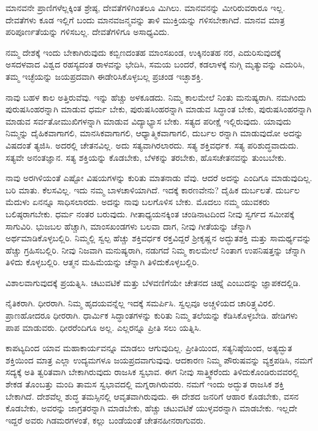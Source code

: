 ಮಾನವನೇ ಪ್ರಾಣಿಗಳೆಲ್ಲಕ್ಕಿಂತ ಶ್ರೇಷ್ಠ, ದೇವತೆಗಳಿಗಿಂತಲೂ ಮಿಗಿಲು. ಮಾನವನನ್ನು ಮೀರಿರುವರಾರೂ ಇಲ್ಲ. ದೇವತೆಗಳು ಕೂಡ ಇಲ್ಲಿಗೆ ಬಂದು ಮಾನವಜನ್ಮವನ್ನು ತಾಳಿ ಮುಕ್ತಿಯನ್ನು ಗಳಿಸಬೇಕಾಗಿದೆ. ಮಾನವ ಮಾತ್ರ ಪರಿಪೂರ್ಣತೆಯನ್ನು ಗಳಿಸಬಲ್ಲ. ದೇವತೆಗಳಿಗೂ ಅಸಾಧ್ಯವಿದು.

ನಮ್ಮ ದೇಶಕ್ಕೆ ಇಂದು ಬೇಕಾಗಿರುವುದು ಕಬ್ಬಿಣದಂತಹ ಮಾಂಸಖಂಡ, ಉಕ್ಕಿನಂತಹ ನರ, ಎದುರಿಸುವುದಕ್ಕೆ ಅಸದಳವಾದ ವಿಶ್ವದ ರಹಸ್ಯದಂತ ರಾಳವನ್ನು ಭೇದಿಸಿ, ಸಮಯ ಬಂದರೆ, ಕಡಲಾಳಕ್ಕೆ ನುಗ್ಗಿ ಮೃತ್ಯುವನ್ನು ಎದುರಿಸಿ, ತಮ್ಮ ಇಚ್ಛೆಯನ್ನು ಜಯಪ್ರದವಾಗಿ ಈಡೇರಿಸಿಕೊಳ್ಳಬಲ್ಲ ಪ್ರಚಂಡ ಇಚ್ಛಾಶಕ್ತಿ.

ನಾವು ಬಹಳ ಕಾಲ ಅತ್ತಿರುವೆವು. ಇನ್ನು ಹೆಚ್ಚು ಅಳಕೂಡದು. ನಿಮ್ಮ ಕಾಲಮೇಲೆ ನಿಂತು ಮನುಷ್ಯರಾಗಿ. ನಮಗಿಂದು ಪುರುಷಸಿಂಹರನ್ನಾಗಿ ಮಾಡುವ ಧರ್ಮ ಬೇಕು, ಪುರುಷಸಿಂಹರನ್ನಾಗಿ ಮಾಡುವ ಸಿದ್ಧಾಂತ ಬೇಕು, ಪುರುಷಸಿಂಹರನ್ನಾಗಿ ಮಾಡುವ ಸರ್ವತೋಮುಖಿಗಳನ್ನಾಗಿ ಮಾಡುವ ವಿದ್ಯಾಭ್ಯಾಸ ಬೇಕು. ಸತ್ಯದ ಪರೀಕ್ಷೆ ಇಲ್ಲಿರುವುದು. ಯಾವುದು ನಿಮ್ಮನ್ನು ದೈಹಿಕವಾಗಾಗಲಿ, ಮಾನಸಿಕವಾಗಾಗಲಿ, ಆಧ್ಯಾತ್ಮಿಕವಾಗಾಗಲಿ, ದುರ್ಬಲ ರನ್ನಾಗಿ ಮಾಡುವುದೋ ಅದನ್ನು ವಿಷದಂತೆ ತ್ಯಜಿಸಿ. ಅದರಲ್ಲಿ ಚೇತನವಿಲ್ಲ. ಅದು ಸತ್ಯವಾಗಿರಲಾರದು. ಸತ್ಯ ಶಕ್ತಿವರ್ಧಕ. ಸತ್ಯ ಪರಿಶುದ್ಧವಾದುದು. ಸತ್ಯವೇ ಅನಂತಜ್ಞಾನ. ಸತ್ಯ ಶಕ್ತಿಯನ್ನು ಕೊಡಬೇಕು, ಬೆಳಕನ್ನು ತರಬೇಕು, ಹೊಸಚೇತನವನ್ನು ತುಂಬಬೇಕು.

ನಾವು ಅರಗಿಳಿಯಂತೆ ಎಷ್ಟೋ ವಿಷಯಗಳನ್ನು ಕುರಿತು ಮಾತನಾಡು ವೆವು. ಆದರೆ ಅದನ್ನು ಎಂದಿಗೂ ಮಾಡುವುದಿಲ್ಲ. ಬರಿ ಮಾತು. ಕೆಲಸವಿಲ್ಲ. ಇದು ನಮ್ಮ ಬಾಳಚಾಳಿಯಾಗಿದೆ. ಇದಕ್ಕೆ ಕಾರಣವೇನು? ದೈಹಿಕ ದುರ್ಬಲತೆ. ದುರ್ಬಲ ಮೆದುಳು ಏನನ್ನೂ ಸಾಧಿಸಲಾರದು. ಅದನ್ನು ನಾವು ಬಲಗೊಳಿಸ ಬೇಕು. ಮೊದಲು ನಮ್ಮ ಯುವಕರು ಬಲಿಷ್ಠರಾಗಬೇಕು. ಧರ್ಮ ನಂತರ ಬರುವುದು. ಗೀತಾಧ್ಯಯನಕ್ಕಿಂತ ಚಂಡಿನಾಟದಿಂದ ನೀವು ಸ್ವರ್ಗದ ಸಮೀಪಕ್ಕೆ ಸಾಗುವಿರಿ. ಭುಜಬಲ ಹೆಚ್ಚಾಗಿ, ಮಾಂಸಖಂಡಗಳು ಬಲವಾ ದಾಗ, ನೀವು ಗೀತೆಯನ್ನು ಚೆನ್ನಾಗಿ ಅರ್ಥಮಾಡಿಕೊಳ್ಳಬಲ್ಲಿರಿ. ನಿಮ್ಮಲ್ಲಿ ಸ್ವಲ್ಪ ಹೆಚ್ಚು ಶಕ್ತಿವರ್ಧಕ ರಕ್ತವಿದ್ದರೆ ಶ್ರೀಕೃಷ್ಣನ ಅದ್ಭುತಶಕ್ತಿ ಮತ್ತು ಸಾಮರ್ಥ್ಯವನ್ನು ಹೆಚ್ಚು ಗ್ರಹಿಸಬಲ್ಲಿರಿ. ನೀವು ನಿಜವಾಗಿ ಮನುಷ್ಯರಾಗಿ, ನಡುಗದೆ ನಿಮ್ಮ ಕಾಲಮೇಲೆ ನಿಂತಾಗ ಉಪನಿಷತ್ತನ್ನು ಚೆನ್ನಾಗಿ ತಿಳಿದು ಕೊಳ್ಳಬಲ್ಲಿರಿ. ಆತ್ಮನ ಮಹಿಮೆಯನ್ನು ಚೆನ್ನಾಗಿ ತಿಳಿದುಕೊಳ್ಳಬಲ್ಲಿರಿ.

ವಿಶಾಲವಾಗುವುದಕ್ಕೆ ಪ್ರಯತ್ನಿಸಿ. ಚಟುವಟಿಕೆ ಮತ್ತು ಬೆಳವಣಿಗೆಯೇ ಚೇತನದ ಚಿಹ್ನೆ ಎಂಬುದನ್ನು ಜ್ಞಾಪಕದಲ್ಲಿಡಿ.

ನೈತಿಕರಾಗಿ. ಧೀರರಾಗಿ. ನಿಮ್ಮ ಹೃದಯವನ್ನೆಲ್ಲ ಇದಕ್ಕೆ ಸಮರ್ಪಿಸಿ. ಸ್ವಲ್ಪವೂ ಅಚ್ಚಳಿಯದ ಚಾರಿತ್ರ್ಯವಿರಲಿ. ಪ್ರಾಣಹೋದರೂ ಧೀರರಾಗಿ. ಧಾರ್ಮಿಕ ಸಿದ್ಧಾಂತಗಳನ್ನು ಕುರಿತು ನಿಮ್ಮ ತಲೆಯನ್ನು ಕೆಡಿಸಿಕೊಳ್ಳಬೇಡಿ. ಹೇಡಿಗಳು ಪಾಪ ಮಾಡುವರು. ಧೀರರೆಂದಿಗೂ ಅಲ್ಲ. ಎಲ್ಲರನ್ನೂ ಪ್ರೀತಿ ಸಲು ಯತ್ನಿಸಿ.

ಕಾಪಟ್ಯದಿಂದ ಯಾವ ಮಹಾಕಾರ್ಯವನ್ನೂ ಮಾಡಲು ಆಗುವುದಿಲ್ಲ. ಪ್ರೀತಿಯಿಂದ, ಸತ್ಯನಿಷ್ಠೆಯಿಂದ, ಅತ್ಯದ್ಭುತ ಶಕ್ತಿಯಿಂದ ಮಾತ್ರ ಎಲ್ಲಾ ಉದ್ಯಮಗಳೂ ಜಯಪ್ರದವಾಗುವುವು. ಆದಕಾರಣ ನಿಮ್ಮ ಪೌರುಷವನ್ನು ವ್ಯಕ್ತಪಡಿಸಿ, ನಮಗೆ ಸದ್ಯಕ್ಕೆ ಅತಿ ತ್ವರಿತವಾಗಿ ಬೇಕಾಗಿರುವುದು ರಾಜಸಿಕ ಸ್ವಭಾವ. ಈಗ ನೀವು ಸಾತ್ತ್ವಿಕರೆಂದು ತಿಳಿದುಕೊಂಡಿರುವವರಲ್ಲಿ ಶೇಕಡ ತೊಂಬತ್ತು ಮಂದಿ ತಾಮಸ ಸ್ವಭಾವದಲ್ಲಿ ಮಗ್ನರಾಗಿರುವರು. ನಮಗೆ ಇಂದು ಅದ್ಭುತ ರಾಜಸಿಕ ಶಕ್ತಿ ಬೇಕಾಗಿದೆ. ದೇಶವೆಲ್ಲ ಶುದ್ಧ ತಮಸ್ಸಿನಲ್ಲಿ ಆವೃತವಾಗಿರುವುದು. ಈ ದೇಶದ ಜನರಿಗೆ ಆಹಾರ ಕೊಡಬೇಕು, ವಸನ ಕೊಡಬೇಕು, ಅವರನ್ನು ಜಾಗ್ರತರನ್ನಾಗಿ ಮಾಡಬೇಕು, ಹೆಚ್ಚು ಚಟುವಟಿಕೆ ಯುಳ್ಳವರನ್ನಾಗಿ ಮಾಡಬೇಕು. ಇಲ್ಲದೇ ಇದ್ದರೆ ಅವರು ಗಿಡಮರಗಳಂತೆ, ಕಲ್ಲು ಬಂಡೆಯಂತೆ ಚೇತನಹೀನರಾಗುವರು.

